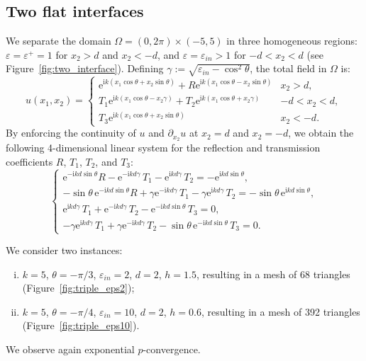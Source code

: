 \documentclass[a4paper,10pt]{article}
\newcommand{\ri}{{\mathrm i}}
\newcommand{\re}{{\mathrm e}}
\begin{document}
\subsection{Two flat interfaces}
\label{s:3regions}

We separate the domain $\Omega=(0,2\pi)\times(-5,5)$ in three homogeneous regions:
$\varepsilon=\varepsilon^+=1$ for $x_2>d$ and $x_2<-d$, 
and 
$\varepsilon=\varepsilon_{in}>1$ for $-d<x_2<d$
(see Figure~\ref{fig:two_interface}).
Defining $\gamma := \sqrt{\varepsilon_{in} - \cos^2 \theta}$, the total field in $\Omega$ is:
\begin{equation} \label{sol_triple}
u(x_1,x_2)  = \begin{cases} 
	\re^{\ri k(x_1 \cos \theta + x_2 \sin \theta)} + R\re^{\ri k(x_1 \cos \theta - x_2\sin\theta)} & x_2>d,\\
	T_1\re^{\ri k(x_1 \cos \theta - x_2 \gamma)} + T_2\re^{\ri k(x_1 \cos \theta + x_2 \gamma)} & -d<x_2<d, \\
	T_3\re^{\ri k(x_1 \cos \theta + x_2 \sin \theta)} & x_2<-d. \end{cases}
	\end{equation}
	By enforcing the continuity of $u$ and $\partial_{x_2} u$ at $x_2 = d$ and $x_2 = -d$, we obtain the following 4-dimensional linear system for the reflection and transmission coefficients $R$, $T_1$, $T_2$, and $T_3$:
	\begin{equation*}
\begin{cases}
	\re^{-\ri kd\sin\theta} R - \re^{-\ri kd \gamma} \, T_1 - \re^{\ri kd \gamma} \, T_2
	= -\re^{\ri kd\sin \theta},\\
	-\sin \theta\, \re^{-\ri kd\sin\theta} R + \gamma \re^{-\ri kd \gamma} \, T_1 
	- \gamma \re^{\ri kd \gamma}\, T_2 = -\sin \theta \,\re^{\ri kd\sin\theta}, \\
	\re^{\ri kd \gamma} \, T_1 + \re^{-\ri kd \gamma} \, T_2 - \re^{-\ri kd\sin\theta} \, T_3 = 0, \\
	-\gamma \re^{\ri kd \gamma} \, T_1 + \gamma \re^{-\ri kd \gamma} \, T_2 - \sin \theta \, \re^{-\ri kd\sin\theta} \, T_3 = 0.
\end{cases}
\end{equation*}

We consider two instances:
\begin{enumerate}[(i)]
\item $k=5$, $\theta = - \pi / 3$, $\varepsilon_{in} = 2$, $d=2$, $h = 1.5$, resulting in a mesh of 68 triangles (Figure~\ref{fig:triple_eps2});
\item $k=5$, $\theta = - \pi / 4$, $\varepsilon_{in} = 10$, $d=2$, $h = 0.6$, resulting in a mesh of 392 triangles (Figure~\ref{fig:triple_eps10}).
\end{enumerate}
We observe again exponential $p$-convergence.
\end{document}
